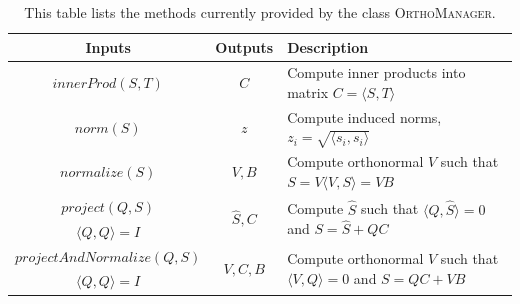 \documentclass[12pt,letterpaper]{SANDreport}
\theoremstyle{example}
\newcommand{\inner}[2]{\langle #1,#2 \rangle}
\begin{document}
\begin{table}[ht]
  \centering
  \caption[Current Ortho. Methods]{This table lists the 
  methods currently provided by the class \textsc{OrthoManager}.}
  \begin{tabular}{|c|c|l|}
    \hline \hline
    Inputs                       & Outputs     & Description \\ \hline 

    \multirow{2}{*}{$innerProd(S,T)$}         & \multirow{2}{*}{$C$}
    & \multirow{2}{7cm}{Compute inner products into matrix $C = \inner{S}{T}$} \\
    & & \\\hline

    \multirow{2}{*}{$norm(S)$}         & \multirow{2}{*}{$z$}
    & \multirow{2}{7cm}{Compute induced norms, $z_i = \sqrt{\inner{s_i}{s_i}}$} \\
    & & \\\hline

    \multirow{2}{*}{$normalize(S)$}         & \multirow{2}{*}{$V,B$}
    & \multirow{2}{7cm}{Compute orthonormal $V$ such that $S = V\inner{V}{S} = VB$} \\ 
    & & \\\hline

    $project(Q,S)$         & \multirow{2}{*}{$\hat{S},C$}
    & \multirow{2}{7cm}{Compute $\hat{S}$ such that $\inner{Q}{\hat{S}} = 0$ and $S = \hat{S} + QC$} \\
    $\inner{Q}{Q}=I$ & & \\\hline

    $projectAndNormalize(Q,S)$ & \multirow{2}{*}{$V,C,B$}
    & \multirow{2}{7cm}{Compute orthonormal $V$ such that $\inner{V}{Q}=0$ and $S = QC+VB$} \\
    $\inner{Q}{Q}=I$ & & \\\hline

    \hline
  \end{tabular}
  \label{tbl:current}
\end{table}
\end{document}
